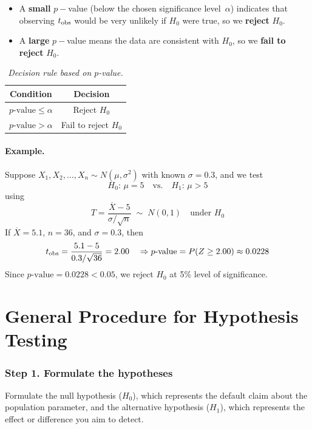 \documentclass[twoside]{book}
\begin{document}
\begin{itemize}
	\item A \textbf{small} $p-$value (below the chosen significance level~$\alpha$) indicates that observing $t_{\rm obs}$ would be very unlikely if $H_0$ were true, so we \textbf{reject} $H_0$.
	\item A \textbf{large} $p-$value means the data are consistent with $H_0$, so we \textbf{fail to reject} $H_0$.
\end{itemize}

\begin{table}[H]
	\centering
	\vspace{0.5em}
	\renewcommand{\arraystretch}{1.5}
	\begin{tabular}{c|c}
		\toprule
		\textbf{Condition} & \textbf{Decision} \\
		\midrule
		$p\text{-value} \leq \alpha$  & Reject $H_0$ \\
		$p\text{-value} > \alpha$  & Fail to reject $H_0$ \\
		\bottomrule
	\end{tabular}
\caption{\textit{Decision rule based on $p$-value.}}
\end{table}

\paragraph{Example.}
Suppose $X_1,X_2,\dots,X_n\sim N(\mu,\sigma^2)$ with known $\sigma=0.3$, and we test
\[
H_0:\,\mu=5
\quad\text{vs.}\quad
H_1:\,\mu>5
\]
using
\[
T = \frac{\overline X - 5}{\sigma/\sqrt{n}}
\;\sim\; N(0,1)
\quad\text{under }H_0
\]
If $\overline X=5.1$, $n=36$, and $\sigma=0.3$, then
\[
t_{\rm obs}
= \frac{5.1 - 5}{0.3/\sqrt{36}}
= 2.00
\quad
\Rightarrow p\text{-value} = P(Z \ge 2.00) \approx 0.0228
\]
Since $p\text{-value}=0.0228<0.05$, we reject $H_0$ at 5\% level of significance.


\section{General Procedure for Hypothesis Testing}


	\subsubsection*{Step 1. Formulate the hypotheses}
	Formulate the {null hypothesis} ($H_0$), which represents the default claim about the population parameter, and the {alternative hypothesis} ($H_1$), which represents the effect or difference you aim to detect.
\end{document}
